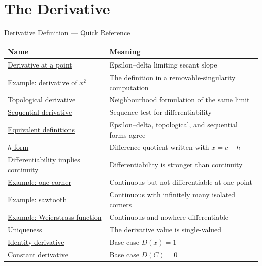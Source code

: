 \section{The Derivative}

\begin{toolkitbox}{Derivative Definition --- Quick Reference}
\small
\begin{tabular}{l l}
\toprule
\textbf{Name} & \textbf{Meaning} \\
\midrule
\hyperref[def:derivative-at-a-point]{Derivative at a point} & Epsilon--delta limiting secant slope \\
\hyperref[ex:x2-derivative]{Example: derivative of \(x^2\)} & The definition in a removable-singularity computation \\
\hyperref[def:topological-definition-of-derivative-at-a-point]{Topological derivative} & Neighbourhood formulation of the same limit \\
\hyperref[def:sequential-definition-of-derivative-at-a-point]{Sequential derivative} & Sequence test for differentiability \\
\hyperref[thm:derivative-equivalence]{Equivalent definitions} & Epsilon--delta, topological, and sequential forms agree \\
\hyperref[prop:derivative-h-form-equivalence]{$h$-form} & Difference quotient written with \(x=c+h\) \\
\hyperref[thm:differentiable-implies-continuous]{Differentiability implies continuity} & Differentiability is stronger than continuity \\
\hyperref[ex:cont-not-diff-corner]{Example: one corner} & Continuous but not differentiable at one point \\
\hyperref[ex:cont-not-diff-sawtooth]{Example: sawtooth} & Continuous with infinitely many isolated corners \\
\hyperref[ex:weierstrass]{Example: Weierstrass function} & Continuous and nowhere differentiable \\
\hyperref[thm:uniqueness-of-the-derivative]{Uniqueness} & The derivative value is single-valued \\
\hyperref[prop:derivative-of-the-identity]{Identity derivative} & Base case \(D(x)=1\) \\
\hyperref[prop:derivative-of-a-constant]{Constant derivative} & Base case \(D(C)=0\) \\
\bottomrule
\end{tabular}
\end{toolkitbox}


